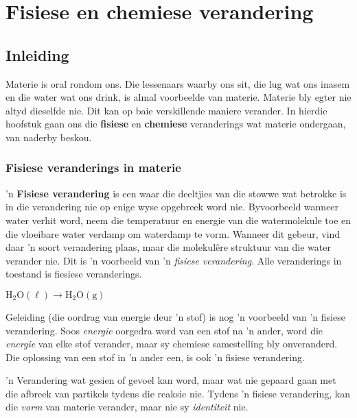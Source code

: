          \chapter{Fisiese en chemiese verandering}
    \label{m38709*cid1}
            \section{Inleiding}
            \nopagebreak


      \label{m38709*id62175}Materie is oral rondom ons. Die lessenaars waarby ons sit, die lug wat ons inasem en die water wat ons drink, is almal
voorbeelde van materie. Materie bly egter nie altyd dieselfde nie. Dit kan op baie verskillende
maniere verander. In hierdie hoofstuk gaan ons die \textbf{fisiese} en \textbf{chemiese} veranderings wat materie ondergaan, van naderby
beskou.\par 
{}
    \label{m38709*cid2}
            \subsection*{Fisiese veranderings in materie}
            \nopagebreak
      \label{m38709*id62200} 'n \textbf{Fisiese verandering} is een waar die deeltjies van die stowwe wat betrokke is in die verandering
nie op enige wyse opgebreek word nie. Byvoorbeeld wanneer water verhit word, neem die temperatuur en energie van
die watermolekule toe en die vloeibare water verdamp om waterdamp te vorm. Wanneer dit gebeur, vind daar  'n soort
verandering plaas, maar die molekulêre struktuur van die water verander nie. Dit is 'n voorbeeld van 'n \textsl{fisiese verandering}. Alle veranderings in toestand is fiesiese veranderings. \par 
      \label{m38709*id62556}$\text{H}{}_{2}\text{O}\left( \ell \right)\to \text{H}{}_{2}\text{O}\left(\text{g}\right)$
      \par 
      \label{m38709*id62600}Geleiding (die oordrag van energie deur 'n stof) is nog 'n voorbeeld van 'n fisiese verandering. Soos \textsl{energie} oorgedra word van een stof na 'n ander, word die \textsl{energie} van elke stof verander, maar sy chemiese samestelling bly onveranderd. Die oplossing van een stof in 'n ander een, is ook 'n fisiese verandering.\par 
\label{m38709*fhsst!!!underscore!!!id76}
  { \label{m38709*meaningfhsst!!!underscore!!!id76}
      'n Verandering wat gesien of gevoel kan word, maar wat nie gepaard gaan met die afbreek van partikels tydens die
reaksie nie. Tydens 'n fisiese verandering, kan die \textsl{vorm} van materie verander, maar nie sy \textsl{identiteit} nie. 
       } 

